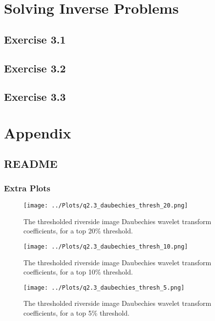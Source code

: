 \documentclass[12pt]{report} %
\begin{document}
\chapter{Solving Inverse Problems}

\section{Exercise 3.1}


\section{Exercise 3.2}


\section{Exercise 3.3}


\chapter{Appendix}

\section{README}

\subsection{Extra Plots}

\begin{figure}[htbp]
    \centering
    \texttt{[image: ../Plots/q2.3\_daubechies\_thresh\_20.png]}
    \caption{The thresholded riverside image Daubechies wavelet transform coefficients, for a top 20\% threshold.}
    \label{fig:thresholded_image20}
\end{figure}

\begin{figure}[htbp]
    \centering
    \texttt{[image: ../Plots/q2.3\_daubechies\_thresh\_10.png]}
    \caption{The thresholded riverside image Daubechies wavelet transform coefficients, for a top 10\% threshold.}
    \label{fig:thresholded_image10}
\end{figure}

\begin{figure}[htbp]
    \centering
    \texttt{[image: ../Plots/q2.3\_daubechies\_thresh\_5.png]}
    \caption{The thresholded riverside image Daubechies wavelet transform coefficients, for a top 5\% threshold.}
    \label{fig:thresholded_image5}
\end{figure}
\end{document}

